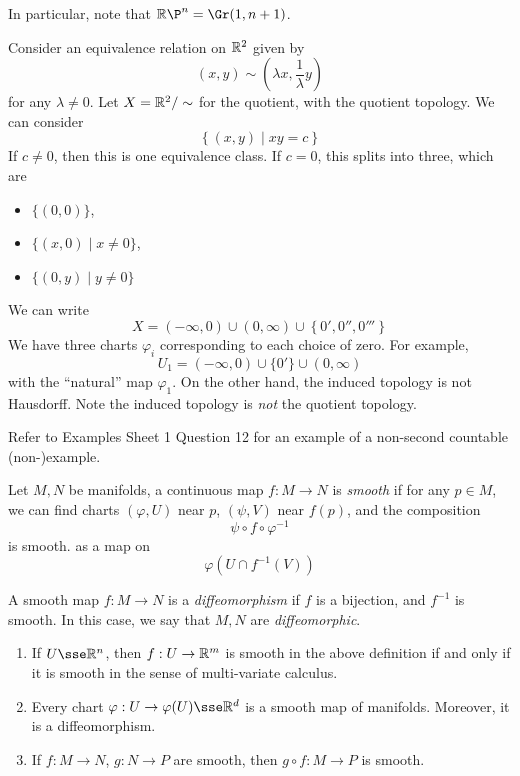 \documentclass{article}
\begin{document}
In particular, note that \(\R\P^n = \Gr(1, n+1)\).

\begin{example}
     Consider an equivalence relation on \(\mathbb{R}^2\) given by
    \[(x, y) \sim \left(\lambda x, \frac{1}{\lambda}y\right)\]
    for any \(\lambda \ne 0\). Let \(X = \mathbb{R}^2/\sim\) for the quotient, with the quotient topology. We can consider
    \[\left\{(x, y) \mid xy = c\right\}\]
    If \(c \ne 0\), then this is one equivalence class. If \(c = 0\), this splits into three, which are
    \begin{itemize}
        \item \(\{(0, 0)\}\),
        \item \(\{(x, 0) \mid x \ne 0\}\),
        \item \(\{(0, y) \mid y \ne 0\}\)
    \end{itemize}
    We can write
    \[X = (-\infty, 0) \cup (0, \infty) \cup \left\{0', 0'', 0'''\right\}\]
    We have three charts \(\varphi_i\) corresponding to each choice of zero. For example,
    \[U_1 = (-\infty, 0) \cup \{0'\} \cup (0, \infty)\]
    with the ``natural'' map \(\varphi_1\). On the other hand, the induced topology is not Hausdorff. Note the induced topology is \emph{not} the quotient topology.
\end{example}

Refer to Examples Sheet 1 Question 12 for an example of a non-second countable (non-)example.

\begin{definition}
     Let \(M, N\) be manifolds, a continuous map \(f : M \to N\) is \emph{smooth} if for any \(p \in M\), we can find charts \((\varphi, U)\) near \(p\), \((\psi, V)\) near \(f(p)\), and the composition
    \[\psi \circ f \circ \varphi^{-1}\]
    is smooth. as a map on
    \[\varphi(U \cap f^{-1}(V))\]
\end{definition}

\begin{definition}
    [diffeomorphism] A smooth map \(f : M \to N\) is a \emph{diffeomorphism} if \(f\) is a bijection, and \(f^{-1}\) is smooth. In this case, we say that \(M, N\) are \emph{diffeomorphic}.
\end{definition}

\begin{proposition}
    \begin{enumerate}
        \item If \(U \sse \R^n\), then \(f : U \to \mathbb{R}^m\) is smooth in the above definition if and only if it is smooth in the sense of multi-variate calculus.
        \item Every chart \(\varphi : U \to \varphi(U) \sse \R^d\) is a smooth map of manifolds. Moreover, it is a diffeomorphism.
        \item If \(f : M \to N\), \(g : N \to P\) are smooth, then \(g \circ f : M \to P\) is smooth.
    \end{enumerate}
\end{proposition}
\end{document}
